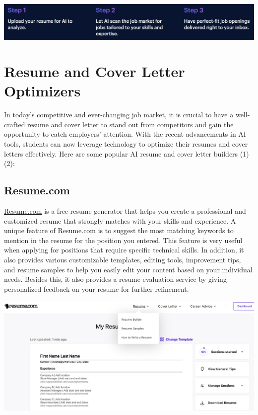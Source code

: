 \documentclass[
]{book}
\begin{document}
\includegraphics[width=5.66667in,height=\textheight]{pyjama jobs.png}

\hypertarget{resume-and-cover-letter-optimizers}{%
\chapter{Resume and Cover Letter Optimizers}\label{resume-and-cover-letter-optimizers}}

In today's competitive and ever-changing job market, it is crucial to have a well-crafted resume and cover letter to stand out from competitors and gain the opportunity to catch employers' attention. With the recent advancements in AI tools, students can now leverage technology to optimize their resumes and cover letters effectively. Here are some popular AI resume and cover letter builders (1) (2):

\hypertarget{resume.com}{%
\section{Resume.com}\label{resume.com}}

\href{https://www.resume.com/resume/builder/783ccdad-f0ea-4ff0-aa57-c59d6100995a}{Resume.com} is a free resume generator that helps you create a professional and customized resume that strongly matches with your skills and experience. A unique feature of Resume.com is to suggest the most matching keywords to mention in the resume for the position you entered. This feature is very useful when applying for positions that require specific technical skills. In addition, it also provides various customizable templates, editing tools, improvement tips, and resume samples to help you easily edit your content based on your individual needs. Besides this, it also provides a resume evaluation service by giving personalized feedback on your resume for further refinement.

\includegraphics[width=5.90625in,height=\textheight]{Resume.com pic.png}
\end{document}
